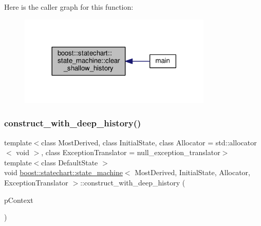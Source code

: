 Here is the caller graph for this function\+:
\nopagebreak
\begin{figure}[H]
\begin{center}
\leavevmode
\includegraphics[width=261pt]{classboost_1_1statechart_1_1state__machine_a03faf369327ddc16441c8e69db08e861_icgraph}
\end{center}
\end{figure}
\mbox{\label{classboost_1_1statechart_1_1state__machine_a56fbbcb60de6f8a423b3b79ddb06ba34}} 
\subsubsection{\texorpdfstring{construct\+\_\+with\+\_\+deep\+\_\+history()}{construct\_with\_deep\_history()}}
{\footnotesize\ttfamily template$<$class Most\+Derived, class Initial\+State, class Allocator = std\+::allocator$<$ void $>$, class Exception\+Translator = null\+\_\+exception\+\_\+translator$>$ \\
template$<$class Default\+State $>$ \\
void \mbox{\hyperlink{classboost_1_1statechart_1_1state__machine}{boost\+::statechart\+::state\+\_\+machine}}$<$ Most\+Derived, Initial\+State, Allocator, Exception\+Translator $>$\+::construct\+\_\+with\+\_\+deep\+\_\+history (\begin{DoxyParamCaption}\item[{const typename Default\+State\+::context\+\_\+ptr\+\_\+type \&}]{p\+Context }\end{DoxyParamCaption})\hspace{0.3cm}{\ttfamily [inline]}}

\mbox{\label{classboost_1_1statechart_1_1state__machine_aeb9f786953e992c8a4725404f011395b}} 
